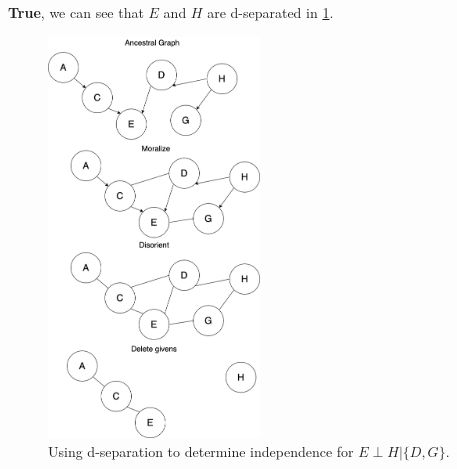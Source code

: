 \documentclass[10pt, a4paper, english]{../Template/NTNUoving}
\begin{document}
\begin{oppgave}
    \begin{punkt}
        \textbf{True}, we can see that $E$ and $H$ are d-separated in \ref{fig:2c}.
        \begin{figure}[H]
            \centering
            \includegraphics[width=0.5\textwidth]{Task2c.png}
            \caption{Using d-separation to determine independence for $E \perp H | \{D, G\}$.}
            \label{fig:2c}
            \end{figure}
    \end{punkt}


\end{oppgave}
\end{document}
